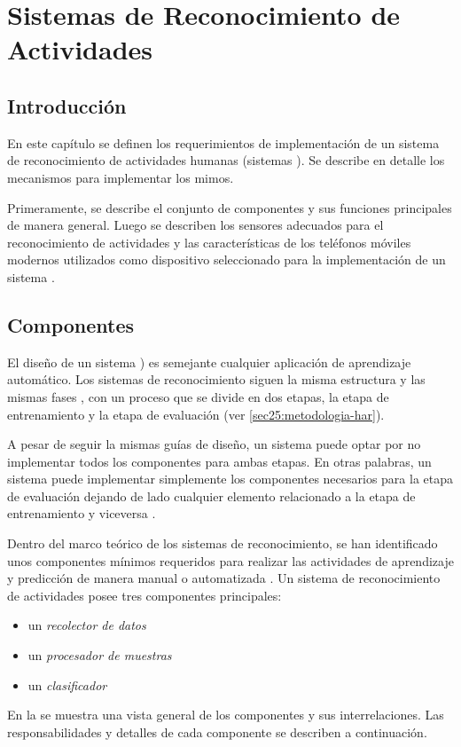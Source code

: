 
\chapter{Sistemas de Reconocimiento de Actividades }

\label{chap4:sistemas-de-reconocimiento}

\section{Introducción}

\label{sec21:introduccion}

En este capítulo se definen los requerimientos de implementación de
un sistema de reconocimiento de actividades humanas (sistemas ).
Se describe en detalle los mecanismos para implementar los mimos. 

Primeramente, se describe el conjunto de componentes y sus funciones
principales de manera general. Luego se describen los sensores adecuados
para el reconocimiento de actividades y las características de los
teléfonos móviles modernos utilizados como dispositivo seleccionado
para la implementación de un sistema .

\section{Componentes}

El diseño de un sistema ) es semejante cualquier aplicación
de aprendizaje automático. Los sistemas de reconocimiento siguen la
misma estructura y las mismas fases \cite{LaraLabrador2013}, con
un proceso que se divide en dos etapas, la etapa de entrenamiento
y la etapa de evaluación (ver \ref{sec25:metodologia-har}). 

A pesar de seguir la mismas guías de diseño, un sistema puede optar
por no implementar todos los componentes para ambas etapas. En otras
palabras, un sistema puede implementar simplemente los componentes
necesarios para la etapa de evaluación dejando de lado cualquier elemento
relacionado a la etapa de entrenamiento y viceversa . 

Dentro del marco teórico de los sistemas de reconocimiento, se han
identificado unos componentes mínimos requeridos para realizar las
actividades de aprendizaje y predicción de manera manual o automatizada
\cite{Choudhury2008}. Un sistema de reconocimiento de actividades
posee tres componentes principales:
\begin{itemize}
\item un \emph{recolector de datos}
\item un\emph{ procesador de muestras} 
\item un \emph{clasificador }
\end{itemize}
En la  se muestra una vista general
de los componentes y sus interrelaciones. Las responsabilidades y
detalles de cada componente se describen a continuación. 


